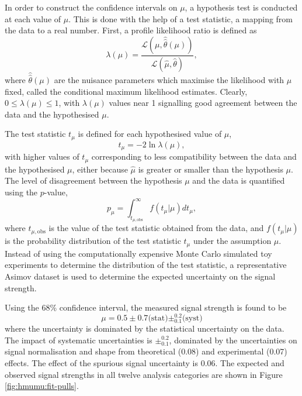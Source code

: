 In order to construct the confidence intervals on $\mu$, a hypothesis
test is conducted at each value of $\mu$. This is done with the help
of a test statistic, a mapping from the data to a real number.
First, a profile likelihood ratio is defined as
\begin{equation}
\lambda(\mu) =
\frac{\mathcal{L}(\mu, \hat{\hat\theta}(\mu))}
     {\mathcal{L}(\hat\mu, \hat\theta)},
\end{equation}
where $\hat{\hat\theta}(\mu)$ are the nuisance parameters which maximise
the likelihood with $\mu$ fixed, called the conditional maximum
likelihood estimates. Clearly, $0 \leq \lambda(\mu) \leq 1$, with $\lambda(\mu)$
values near 1 signalling good agreement between the data and the
hypothesised $\mu$.

The test statistic $t_\mu$ is defined for each hypothesised value of
$\mu$,
\begin{equation}
t_\mu = -2\ln\lambda(\mu),
\end{equation}
with higher values of $t_\mu$ corresponding to less compatibility
between the data and the hypothesised $\mu$, either because
$\hat\mu$ is greater or smaller than the hypothesis $\mu$.
The level of disagreement between the hypothesis $\mu$ and the
data is quantified using the $p$-value,
\begin{equation}
p_\mu = \int_{t_{\mu, \text{obs}}}^{\infty} f(t_\mu|\mu) dt_\mu,
\end{equation}
where $t_{\mu, \text{obs}}$ is the value of the test statistic
obtained from the data, and $f(t_\mu|\mu)$ is the probability
distribution of the test statistic $t_\mu$ under the
assumption $\mu$. Instead of using the computationally expensive
Monte Carlo simulated toy experiments to determine the distribution
of the test statistic, a representative Asimov dataset \cite{Cowan:2010js} is
used to determine the expected uncertainty on the signal strength.

Using the 68\% confidence interval, the
measured signal strength is found to be
\begin{equation}
\mu = 0.5 \pm 0.7 \text{(stat)} \pm^{0.2}_{0.1} \text{(syst)}
\end {equation}
where the uncertainty is dominated by the statistical uncertainty on the
data. The impact of systematic uncertainties is $\pm^{0.2}_{0.1}$,
dominated by the uncertainties on signal normalisation and shape
from theoretical (0.08) and experimental (0.07) effects. The effect
of the spurious signal uncertainty is 0.06. The expected and observed signal
strengths in all twelve analysis categories are shown in Figure
\ref{fig:hmumu:fit-pulls}.

